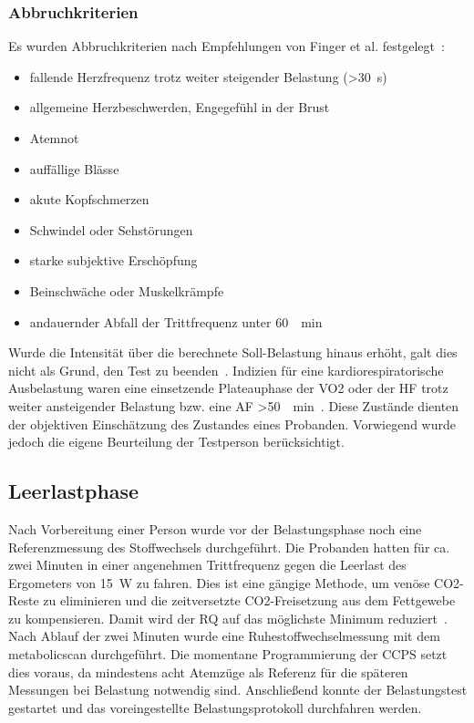 \subsubsection{Abbruchkriterien}
%
Es wurden Abbruchkriterien nach Empfehlungen von Finger et al. festgelegt~\cite{Finger.2013}:
%
\begin{itemize}
	\item fallende Herzfrequenz trotz weiter steigender Belastung (>\SI{30}{\second})
	\item allgemeine Herzbeschwerden, Engegefühl in der Brust
	\item Atemnot
	\item auffällige Blässe
	\item akute Kopfschmerzen
	\item Schwindel oder Sehstörungen
	\item starke subjektive Erschöpfung
	\item Beinschwäche oder Muskelkrämpfe
	\item andauernder Abfall der Trittfrequenz unter \SI{60}{\per\minute}
\end{itemize}
%
Wurde die Intensität über die berechnete Soll-Belastung hinaus erhöht, galt dies nicht als Grund, den Test zu beenden~\cite{Wonisch.2008}. Indizien für eine kardiorespiratorische Ausbelastung waren eine einsetzende Plateauphase der \acs{VO2} oder der \acs{HF} trotz weiter ansteigender Belastung bzw. eine \acs{AF} >\SI{50}{\per\minute}~\cite{Kroidl.2015}. Diese Zustände dienten der objektiven Einschätzung des Zustandes eines Probanden. Vorwiegend wurde jedoch die eigene Beurteilung der Testperson berücksichtigt. 
%
\subsection{Leerlastphase}
%
Nach Vorbereitung einer Person wurde vor der Belastungsphase noch eine Referenzmessung des Stoffwechsels durchgeführt. Die Probanden hatten für ca. zwei Minuten in einer angenehmen Trittfrequenz gegen die Leerlast des Ergometers von \SI{15}{\watt} zu fahren. Dies ist eine gängige Methode, um venöse \acs{CO2}-Reste zu eliminieren und die zeitversetzte  \acs{CO2}-Freisetzung aus dem Fettgewebe zu kompensieren. Damit wird der \acs{RQ} auf das möglichste Minimum reduziert~\cite{Kroidl.2015}. Nach Ablauf der zwei Minuten wurde eine Ruhestoffwechselmessung mit dem metabolicscan durchgeführt. Die momentane Programmierung der \acs{CCPS} setzt dies voraus, da mindestens acht Atemzüge als Referenz für die späteren Messungen bei Belastung notwendig sind. Anschließend konnte der Belastungstest gestartet und das voreingestellte Belastungsprotokoll durchfahren werden.
%
